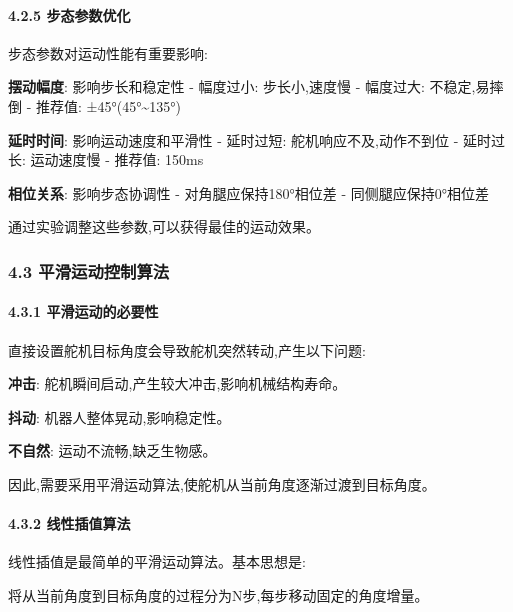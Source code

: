 \documentclass[
]{article}
\begin{document}
\hypertarget{ux6b65ux6001ux53c2ux6570ux4f18ux5316}{%
\paragraph{4.2.5
步态参数优化}\label{ux6b65ux6001ux53c2ux6570ux4f18ux5316}}

步态参数对运动性能有重要影响:

\textbf{摆动幅度}: 影响步长和稳定性 - 幅度过小: 步长小,速度慢 -
幅度过大: 不稳定,易摔倒 - 推荐值: ±45°(45°\textasciitilde135°)

\textbf{延时时间}: 影响运动速度和平滑性 - 延时过短:
舵机响应不及,动作不到位 - 延时过长: 运动速度慢 - 推荐值: 150ms

\textbf{相位关系}: 影响步态协调性 - 对角腿应保持180°相位差 -
同侧腿应保持0°相位差

通过实验调整这些参数,可以获得最佳的运动效果。

\hypertarget{ux5e73ux6ed1ux8fd0ux52a8ux63a7ux5236ux7b97ux6cd5}{%
\subsubsection{4.3
平滑运动控制算法}\label{ux5e73ux6ed1ux8fd0ux52a8ux63a7ux5236ux7b97ux6cd5}}

\hypertarget{ux5e73ux6ed1ux8fd0ux52a8ux7684ux5fc5ux8981ux6027}{%
\paragraph{4.3.1
平滑运动的必要性}\label{ux5e73ux6ed1ux8fd0ux52a8ux7684ux5fc5ux8981ux6027}}

直接设置舵机目标角度会导致舵机突然转动,产生以下问题:

\textbf{冲击}: 舵机瞬间启动,产生较大冲击,影响机械结构寿命。

\textbf{抖动}: 机器人整体晃动,影响稳定性。

\textbf{不自然}: 运动不流畅,缺乏生物感。

因此,需要采用平滑运动算法,使舵机从当前角度逐渐过渡到目标角度。

\hypertarget{ux7ebfux6027ux63d2ux503cux7b97ux6cd5}{%
\paragraph{4.3.2
线性插值算法}\label{ux7ebfux6027ux63d2ux503cux7b97ux6cd5}}

线性插值是最简单的平滑运动算法。基本思想是:

将从当前角度到目标角度的过程分为N步,每步移动固定的角度增量。
\end{document}
